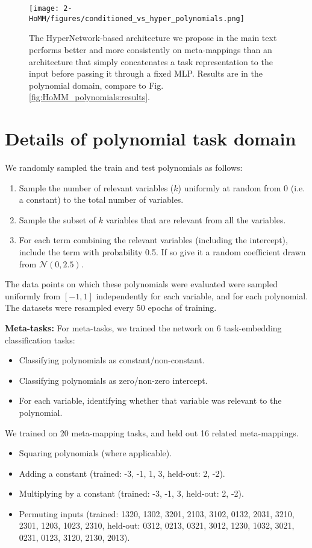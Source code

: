 \begin{figure}[H]
\centering
\texttt{[image: 2-HoMM/figures/conditioned\_vs\_hyper\_polynomials.png]}
\caption{The HyperNetwork-based architecture we propose in the main text performs better and more consistently on meta-mappings than an architecture that simply concatenates a task representation to the input before passing it through a fixed MLP. Results are in the polynomial domain, compare to Fig. \ref{fig:HoMM_polynomials:results}.}\label{supp_fig:HoMM_arch_cond_vs_hyper}
\end{figure}

\section{Details of polynomial task domain} \label{app:HoMM:polynomials_methods}
We randomly sampled the train and test polynomials as follows:
\begin{enumerate}
\item Sample the number of relevant variables ($k$) uniformly at random from 0 (i.e. a constant) to the total number of variables.
\item Sample the subset of $k$ variables that are relevant from all the variables.
\item For each term combining the relevant variables (including the intercept), include the term with probability 0.5. If so give it a random coefficient drawn from $\mathcal{N}(0, 2.5)$.
\end{enumerate}
The data points on which these polynomials were evaluated were sampled uniformly from $[-1, 1]$ independently for each variable, and for each polynomial. The datasets were resampled every 50 epochs of training. \par
\textbf{Meta-tasks:} For meta-tasks, we trained the network on 6 task-embedding classification tasks:
\begin{itemize}
\item Classifying polynomials as constant/non-constant.
\item Classifying polynomials as zero/non-zero intercept.
\item For each variable, identifying whether that variable was relevant to the polynomial.
\end{itemize}
We trained on 20 meta-mapping tasks, and held out 16 related meta-mappings.
\begin{itemize}
\item Squaring polynomials (where applicable).
\item Adding a constant (trained: -3, -1, 1, 3, held-out: 2, -2).
\item Multiplying by a constant (trained: -3, -1, 3, held-out: 2, -2).
\item Permuting inputs (trained: 1320, 1302, 3201, 2103, 3102, 0132, 2031, 3210, 2301, 1203, 1023, 2310, held-out: 0312, 0213, 0321, 3012, 1230, 1032, 3021, 0231, 0123, 3120, 2130, 2013).
\end{itemize}

